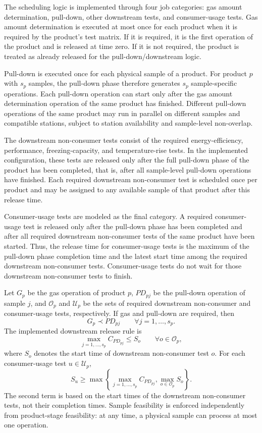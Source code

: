 \documentclass[11pt]{article}
\begin{document}
The scheduling logic is implemented through four job categories: gas amount determination, pull-down, other downstream tests, and consumer-usage tests. Gas amount determination is executed at most once for each product when it is required by the product's test matrix. If it is required, it is the first operation of the product and is released at time zero. If it is not required, the product is treated as already released for the pull-down/downstream logic.

Pull-down is executed once for each physical sample of a product. For product \(p\) with \(s_p\) samples, the pull-down phase therefore generates \(s_p\) sample-specific operations. Each pull-down operation can start only after the gas amount determination operation of the same product has finished. Different pull-down operations of the same product may run in parallel on different samples and compatible stations, subject to station availability and sample-level non-overlap.

The downstream non-consumer tests consist of the required energy-efficiency, performance, freezing-capacity, and temperature-rise tests. In the implemented configuration, these tests are released only after the full pull-down phase of the product has been completed, that is, after all sample-level pull-down operations have finished. Each required downstream non-consumer test is scheduled once per product and may be assigned to any available sample of that product after this release time.

Consumer-usage tests are modeled as the final category. A required consumer-usage test is released only after the pull-down phase has been completed and after all required downstream non-consumer tests of the same product have been started. Thus, the release time for consumer-usage tests is the maximum of the pull-down phase completion time and the latest start time among the required downstream non-consumer tests. Consumer-usage tests do not wait for those downstream non-consumer tests to finish.

Let \(G_p\) be the gas operation of product \(p\), \(PD_{pj}\) be the pull-down operation of sample \(j\), and \(\mathcal{O}_p\) and \(\mathcal{U}_p\) be the sets of required downstream non-consumer and consumer-usage tests, respectively. If gas and pull-down are required, then
\[
G_p \prec PD_{pj} \qquad \forall j=1,\ldots,s_p.
\]
The implemented downstream release rule is
\[
\max_{j=1,\ldots,s_p} C_{PD_{pj}} \le S_o
\qquad \forall o\in\mathcal{O}_p,
\]
where \(S_o\) denotes the start time of downstream non-consumer test \(o\). For each consumer-usage test \(u\in\mathcal{U}_p\),
\[
S_u \ge
\max\left\{
\max_{j=1,\ldots,s_p} C_{PD_{pj}},
\max_{o\in\mathcal{O}_p} S_o
\right\}.
\]
The second term is based on the start times of the downstream non-consumer tests, not their completion times. Sample feasibility is enforced independently from product-stage feasibility: at any time, a physical sample can process at most one operation.
\end{document}
